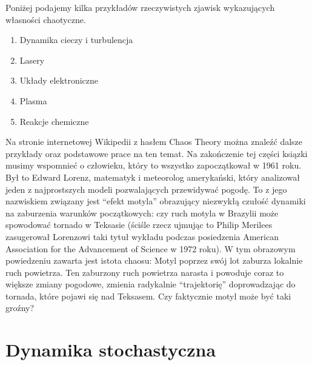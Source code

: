 \documentclass[a4paper,12pt,polish]{sphinxmanual}
\begin{document}
Poniżej podajemy kilka przykładów rzeczywistych zjawisk wykazujących własności chaotyczne.
\begin{enumerate}
\item {} 
Dynamika cieczy i turbulencja

\item {} 
Lasery

\item {} 
Układy elektroniczne

\item {} 
Plasma

\item {} 
Reakcje chemiczne

\end{enumerate}

Na stronie internetowej Wikipedii  z hasłem Chaos Theory  można znaleźć dalsze przykłady oraz podstawowe prace na ten temat. Na zakończenie tej części ksiązki musimy wspomnieć o człowieku, który to wszystko zapoczątkował w 1961 roku. Był to Edward Lorenz, matematyk i meteorolog amerykański,  który analizował jeden z najprostszych modeli pozwalających przewidywać pogodę. To z jego nazwiskiem związany jest  ``efekt motyla'' obrazujący niezwykłą czułość dynamiki na zaburzenia warunków  początkowych: czy ruch motyla w Brazylii może spowodować tornado w Teksasie (ściśle rzecz ujmując to Philip Merilees zasugerował  Lorenzowi taki tytuł wykładu podczas posiedzenia American Association for the Advancement of Science w 1972 roku). W tym obrazowym powiedzeniu zawarta jest istota chaosu: Motyl poprzez swój lot zaburza lokalnie ruch powietrza. Ten zaburzony ruch powietrza narasta i powoduje coraz to większe zmiany pogodowe, zmienia radykalnie ``trajektorię''  doprowadzając do tornada, które pojawi się nad Teksasem. Czy faktycznie motyl może być  taki groźny?


\chapter{Dynamika stochastyczna}
\label{index:id1}
\end{document}
